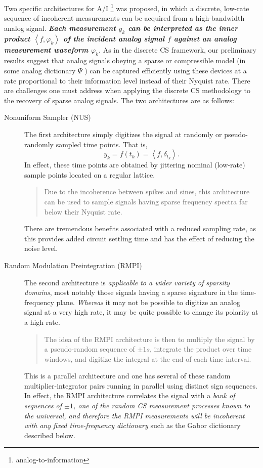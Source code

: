 Two specific architectures for A/I \footnote{analog-to-information} was proposed, in which a discrete, low-rate sequence of incoherent measurements can be acquired from a high-bandwidth analog signal. \textbf{\textcolor[rgb]{1,0,0}{\emph{Each measurement $y_k$ can be interpreted as the inner product $\left<f,\varphi_k\right>$ of the incident analog signal $f$ against an analog measurement waveform $\varphi_k$}}}\label{key}. As in the discrete CS
framework, our preliminary results suggest that analog signals obeying a sparse or compressible model (in some analog dictionary $\Psi$ ) can be captured efficiently using these devices at a rate proportional to their information level instead of their Nyquist rate. There are challenges one must address when applying the discrete CS methodology to the recovery of sparse analog signals. The two architectures are as follows:
\begin{description}
	\item [Nonuniform Sampler (NUS)] The first architecture simply digitizes the signal at randomly or pseudo-randomly sampled time points. That is,
	\[
	y_k=f(t_k)=\left<f,\delta_{t_k}\right>.
	\]
	In effect, these time points are obtained by jittering nominal (low-rate) sample points located on a regular lattice. 
	\begin{quote}
		Due to the incoherence between spikes and sines, this architecture can be used to sample signals having sparse frequency spectra far below their Nyquist rate.
	\end{quote}
	There are tremendous benefits associated with a reduced sampling rate, as this provides added circuit settling time and has the effect of reducing the noise level.
	\item [Random Modulation Preintegration (RMPI)] The second architecture is \emph{\textcolor[rgb]{1,0,0}{applicable to a wider variety of sparsity domains}}, most notably those signals having a sparse signature in the time-frequency plane. \emph{\textcolor[rgb]{1,0,0}{Whereas}} it may not be possible to digitize an analog signal at a very high rate, it may be quite possible to change its polarity at a high rate.
	\begin{quote}
		The idea of the RMPI architecture is then to multiply the signal by a pseudo-random sequence of $\pm1s$, integrate the product over time windows, and digitize the integral at the end of each time interval. 
	\end{quote}
	This is a parallel architecture and one has several of these random multiplier-integrator pairs running in parallel using distinct sign sequences. In effect, the RMPI architecture correlates the signal with a \emph{\textcolor[rgb]{1,0,0}{bank of sequences of $\pm1$, one of the random CS measurement processes known to the universal, and therefore the RMPI measurements will be incoherent with any fixed time-frequency dictionary}} such as the Gabor dictionary described below.
\end{description}

